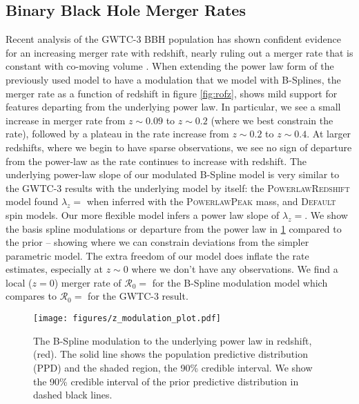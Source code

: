 \subsection{Binary Black Hole Merger Rates}

Recent analysis of the GWTC-3 BBH population has shown confident evidence for an increasing merger rate with redshift, nearly ruling out a merger rate that is 
constant with co-moving volume \citep{Fishbach_2018redshift,o3b_astro_dist}. When extending the power law form of the previously used model to have a modulation 
that we model with B-Splines, the merger rate as a function of redshift in figure \ref{fig:rofz}, shows mild support for features departing from the underlying power law. 
In particular, we see a small increase in merger rate from $z\sim0.09$ to $z\sim0.2$ (where we best constrain the rate), followed by a plateau in the rate increase from $z\sim0.2$ to $z\sim0.4$. 
At larger redshifts, where we begin to have sparse observations, we see no sign of departure from the power-law as the rate continues to increase with redshift. 
The underlying power-law slope of our modulated B-Spline model is very similar to the GWTC-3 results with the underlying model by itself: the \textsc{PowerlawRedshift} model 
found $\lambda_z = $\result{$\CIPlusMinus{\macros[PLPeak][lamb]}$} when inferred with the \textsc{PowerlawPeak} mass, and \textsc{Default} spin models. Our more 
flexible model infers a power law slope of $\lambda_z = $\result{$\CIPlusMinus{\macros[BSplineIIDCompSpins][lamb]}$}. We show the basis spline modulations or departure 
from the power law in \ref{fig:z_modulation} compared to the prior -- showing where we can constrain deviations from the simpler parametric model. 
The extra freedom of our model does inflate the rate estimates, especially at $z\sim0$ where we don't have any observations. We find a local ($z=0$) merger rate 
of $\mathcal{R}_0 = $ for the B-Spline modulation model which compares to 
$\mathcal{R}_0 = $ for the GWTC-3 result. 

\begin{figure}[h]
    \texttt{[image: figures/z\_modulation\_plot.pdf]}
    \caption{The B-Spline modulation to the underlying power law in redshift, (red). The solid line shows the population predictive distribution (PPD) 
    and the shaded region, the 90\% credible interval. We show the 90\% credible interval of the prior predictive distribution in dashed black lines.}
    \label{fig:z_modulation}
\end{figure}